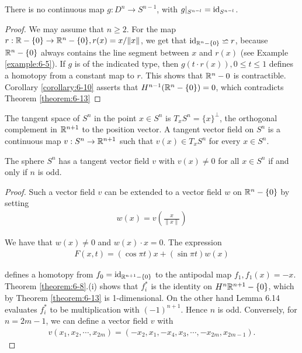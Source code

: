 \begin{lemma}\label{lemma:7-2}
  There is no continuous map $g:D^n\to S^{n-1}$, with $g|_{S^{n-l}} = \operatorname{id}_{S^{n-l}}$.
\end{lemma}

\begin{proof}
  We may assume that $n\ge 2$. For the map $r:\mathbb{R}-\{0\}\to \mathbb{R}^n-\{0\}, r(x)=x/\|x\|$, we 
  get that $\operatorname{id}_{\mathbb{R}^n-\{0\}}\backsimeq r$, because $\mathbb{R}^n-\{0\}$ always contains the line
  segment between $x$ and $r(x)$ (see Example \ref{example:6-5}). If $g$ is of the indicated 
  type, then $g(t\cdot r(x)), 0\le t\le 1$ defines a homotopy from a constant map to $r$. This 
  shows that $\mathbb{R}^n-{0}$ is contractible. Corollary \ref{corollary:6-10} asserts that $H^{n-1}(\mathbb{R}^n-\{0\}) = 0$,
  which contradicts Theorem \ref{theorem:6-13}
\end{proof}

The tangent space of $S^n$ in the point $x\in S^n$ is $T_xS^n = \{x\}^\perp$, the orthogonal
complement in $\mathbb{R}^{n+1}$ to the position vector. A tangent vector field on $S^n$ is a continuous
map $v:S^n\to\mathbb{R}^{n+1}$ such that $v(x)\in T_xS^n$ for every $x\in S^n$.

\begin{theorem}\label{theorem:7-3}
  The sphere $S^n$ has a tangent vector field $v$ with $v(x)\neq 0$ for all $x\in S^n$ if and 
  only if $n$ is odd.
\end{theorem}

\begin{proof}
  Such a vector field $v$ can be extended to a vector field $w$ on $\mathbb{R}^n-\{0\}$
  by setting
  \begin{align*}
    w(x) = v(\frac{x }{\|x\|})
  \end{align*}

  We have that $w(x)\neq 0$ and $w(x)\cdot x = 0$. The expression 
  \begin{align*}
    F(x, t) = (\cos\pi t)x + (\sin\pi t)w(x)
  \end{align*}

  defines a homotopy from $f_0=\operatorname{id}_{\mathbb{R}^{n+1}-\{0\}}$ to the antipodal map $f_1,f_1(x)=-x$.
  Theorem \ref{theorem:6-8}.(i) shows that $f_i^*$ is the identity on $H^n{\mathbb{R}^{n+1}-\{0\}}$, which by
  Theorem \ref{theorem:6-13} is 1-dimensional. On the other hand Lemma 6.14 evaluates $f_i^*$ to
  be multiplication with $(-1)^{n+1}$. Hence $n$ is odd.
  Conversely, for $n=2m-1$, we can define a vector field $v$ with 
  \begin{align*}
    v(x_1,x_2,\cdots,x_{2m}) = (-x_2, x_1, -x_4, x_3, \cdots, -x_{2m}, x_{2m-1}).
  \end{align*}
\end{proof}

